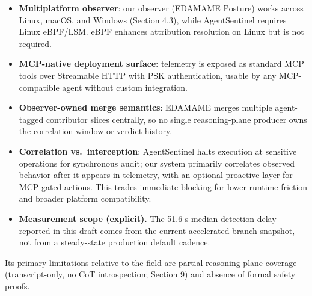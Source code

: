 \documentclass[
]{article}
\providecommand{\tightlist}{%
  \setlength{\itemsep}{0pt}\setlength{\parskip}{0pt}}
\begin{document}
\begin{itemize}
\tightlist
\item
  \textbf{Multiplatform observer}: our observer (EDAMAME Posture) works
  across Linux, macOS, and Windows (Section 4.3), while AgentSentinel
  requires Linux eBPF/LSM. eBPF enhances attribution resolution on Linux
  but is not required.
\item
  \textbf{MCP-native deployment surface}: telemetry is exposed as
  standard MCP tools over Streamable HTTP with PSK authentication,
  usable by any MCP-compatible agent without custom integration.
\item
  \textbf{Observer-owned merge semantics}: EDAMAME merges multiple
  agent-tagged contributor slices centrally, so no single
  reasoning-plane producer owns the correlation window or verdict
  history.
\item
  \textbf{Correlation vs.~interception}: AgentSentinel halts execution
  at sensitive operations for synchronous audit; our system primarily
  correlates observed behavior after it appears in telemetry, with an
  optional proactive layer for MCP-gated actions. This trades immediate
  blocking for lower runtime friction and broader platform
  compatibility.
\item
  \textbf{Measurement scope (explicit).} The 51.6 s median detection
  delay reported in this draft comes from the current accelerated branch
  snapshot, not from a steady-state production default cadence.
\end{itemize}

Its primary limitations relative to the field are partial
reasoning-plane coverage (transcript-only, no CoT introspection; Section
9) and absence of formal safety proofs.
\end{document}
